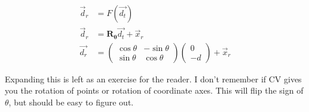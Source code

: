 \documentclass[12pt, oneside]{article}
\begin{document}
\begin{align}
\vec{d}_r &= F(\vec{d_t})\\
\vec{d}_r &= \boldsymbol{R_\theta} \vec{d_t} + \vec{x}_r\\
\vec{d_r} &= \begin{pmatrix}\cos{\theta} & -\sin{\theta}\\\sin{\theta} & \cos{\theta}\end{pmatrix} \begin{pmatrix}0 \\ -d	\end{pmatrix} + \vec{x}_r
\end{align}

Expanding this is left as an exercise for the reader. I don't remember if CV gives you the rotation of points or rotation of coordinate axes. This will flip the sign of $\theta$, but should be easy to figure out.
\end{document}
